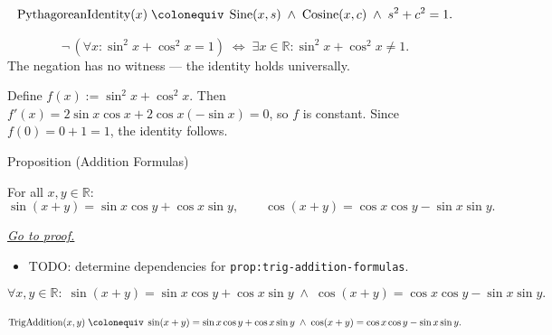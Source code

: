 \begin{remark*}
\[
  \operatorname{PythagoreanIdentity}(x)
  \;\colonequiv\;
  \operatorname{Sine}(x,s) \;\wedge\; \operatorname{Cosine}(x,c)
  \;\wedge\; s^2 + c^2 = 1.
\]
\end{remark*}

\begin{remark*}
\[
  \neg\,(\forall x:\sin^2 x+\cos^2 x=1)
  \;\iff\;
  \exists x\in\mathbb{R}:\sin^2 x+\cos^2 x\neq 1.
\]
The negation has no witness --- the identity holds universally.
\end{remark*}

\begin{remark*}
Define $f(x) := \sin^2 x + \cos^2 x$. Then $f'(x) = 2\sin x \cos x
+ 2\cos x(-\sin x) = 0$, so $f$ is constant. Since $f(0) = 0 + 1 =
1$, the identity follows.
\end{remark*}


\begin{propositionbox}{Proposition (Addition Formulas)}
\begin{proposition}
\label{prop:trig-addition-formulas}
For all $x, y \in \mathbb{R}$:
\[
  \sin(x+y) = \sin x \cos y + \cos x \sin y,
  \qquad
  \cos(x+y) = \cos x \cos y - \sin x \sin y.
\]

\smallskip\noindent
\hyperref[prf:trig-addition-formulas]{\textit{Go to proof.}}
\end{proposition}
\end{propositionbox}

\begin{dependencies}
\begin{itemize}
  \item TODO: determine dependencies for \texttt{prop:trig-addition-formulas}.
\end{itemize}
\end{dependencies}

\begin{remark*}
\[
  \forall x,y\in\mathbb{R}:\;
  \sin(x+y) = \sin x\cos y + \cos x\sin y
  \;\wedge\;
  \cos(x+y) = \cos x\cos y - \sin x\sin y.
\]
\end{remark*}

\begin{remark*}
\[
  \operatorname{TrigAddition}(x,y)
  \;\colonequiv\;
  \sin(x+y) = \sin x\cos y + \cos x\sin y
  \;\wedge\;
  \cos(x+y) = \cos x\cos y - \sin x\sin y.
\]
\end{remark*}

